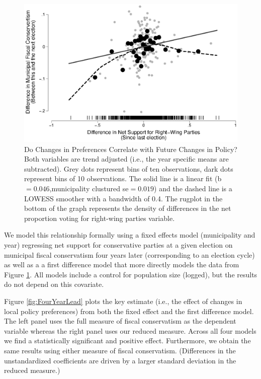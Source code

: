 \documentclass[a4paper,12pt]{article}
\begin{document}
\begin{figure}[h]
	\centering
	\includegraphics[scale = 1]{scatterplot.eps}
	\caption{Do Changes in Preferences Correlate with Future Changes in Policy? Both variables are trend adjusted (i.e., the year specific means are subtracted). Grey dots represent bins of ten observations, dark dots represent bins of 10 observations. The solid line is a linear fit (b$=0.046$,municipality clustured se$=0.019$) and the dashed line is a LOWESS smoother with a bandwidth of 0.4. The rugplot in the bottom of the graph represents the density of differences in the net proportion voting for right-wing parties variable. }
	\label{fig:scatter}
\end{figure}

We model this relationship formally using a fixed effects model (municipality and year) regressing net support for conservative parties at a given election on municipal fiscal conservatism four years later (corresponding to an election cycle) as well as a a first difference model that more directly models the data from Figure \ref{fig:scatter}. All models include a control for population size (logged), but the results do not depend on this covariate.

Figure \ref{fig:FourYearLead} plots the key estimate (i.e., the effect of changes in local policy preferences) from both the fixed effect and the first difference model. The  left panel uses the full measure of fiscal conservatism as the dependent variable whereas the right panel uses our reduced measure. Across all four models we find a statistically significant and positive effect. Furthermore, we obtain the same results using either measure of fiscal conservatism. (Differences in the unstandardized coefficients are driven by a larger standard deviation in the reduced measure.) 
\end{document}
